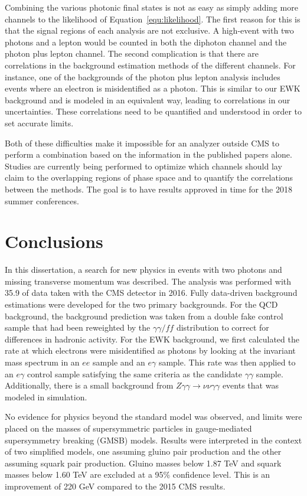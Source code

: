 Combining the various photonic final states is not as easy as simply adding more 
channels to the likelihood of Equation~\ref{equ:likelihood}. The first reason for this is
that the signal regions of each analysis are not exclusive. A high-\ETmiss event with two photons 
and a lepton would be counted in both the diphoton channel and the photon plus lepton channel.
The second complication is that there are correlations
in the background estimation methods of the different channels.
For instance, one of the backgrounds of the 
photon plus lepton analysis includes events where an electron is misidentified as a photon.
This is similar to our EWK background and is modeled in an equivalent way, leading to 
correlations in our uncertainties. These correlations need to be quantified and understood 
in order to set accurate limits.

Both of these difficulties 
make it impossible for an analyzer outside CMS to perform a combination based on the information 
in the published papers alone.
Studies are currently being performed to optimize which channels should
lay claim to the overlapping regions of phase space 
and to quantify the correlations between the methods. The goal is to have
results approved in time for the 2018 summer conferences.

\section{Conclusions}
\label{sec:conclusions}
In this dissertation, a search for new physics in events with two photons and missing transverse momentum was described. The analysis was performed with 35.9 \fbinv of data taken with the CMS detector in 2016. Fully data-driven background estimations were developed for the two primary backgrounds. For the QCD background, the background prediction was taken from a double fake control sample that had been reweighted by the $\gamma\gamma/ff$ \diempt distribution to correct for differences in hadronic activity. For the EWK background, we first calculated the rate at which electrons were misidentified as photons by looking at the invariant mass spectrum in an $ee$ sample and an $e\gamma$ sample. This rate was then applied to an $e\gamma$ control sample satisfying the same criteria as the candidate $\gamma\gamma$ sample. Additionally, there is a small background from $Z\gamma\gamma\rightarrow\nu\nu\gamma\gamma$ events that was modeled in simulation. 

No evidence for physics beyond the standard model was observed, and limits were placed on the masses of supersymmetric particles
in gauge-mediated supersymmetry breaking (GMSB) models. Results were interpreted in the context of two simplified models, one assuming gluino pair production and the other assuming squark pair production. Gluino masses below 1.87 TeV and squark masses below 1.60 TeV are excluded at a 95\% confidence level. This is an improvement of 220 GeV compared to the 2015 CMS results.